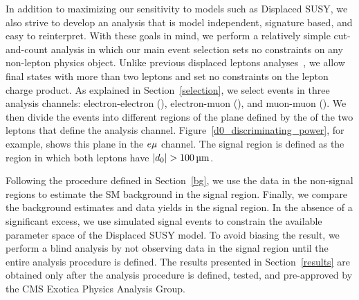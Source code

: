 In addition to maximizing our sensitivity to models such as Displaced SUSY, we also strive to develop an analysis that is model independent, signature based, and easy to reinterpret. With these goals in mind, we perform a relatively simple cut-and-count analysis in which our main event selection sets no constraints on any non-lepton physics object. Unlike previous displaced leptons analyses~\cite{displaced_leptons_run1, displaced_leptons_bing}, we allow final states with more than two leptons and set no constraints on the lepton charge product. As explained in Section~\ref{selection}, we select events in three analysis channels: electron-electron (\Pe\Pe), electron-muon (\Pe\Pgm), and muon-muon (\Pgm\Pgm). We then divide the events into different regions of the plane defined by the \ad of the two leptons that define the analysis channel. Figure~\ref{d0_discriminating_power}, for example, shows this plane in the $e{\mu}$ channel. The signal region is defined as the region in which both leptons have $\ad>\SI{100}{\um}$.

Following the procedure defined in Section~\ref{bg}, we use the data in the non-signal regions to estimate the SM background in the signal region. Finally, we compare the background estimates and data yields in the signal region. In the absence of a significant excess, we use simulated signal events to constrain the available parameter space of the Displaced SUSY model. To avoid biasing the result, we perform a blind analysis by not observing data in the signal region until the entire analysis procedure is defined. The results presented in Section~\ref{results} are obtained only after the analysis procedure is defined, tested, and pre-approved by the CMS Exotica Physics Analysis Group.


\pagebreak